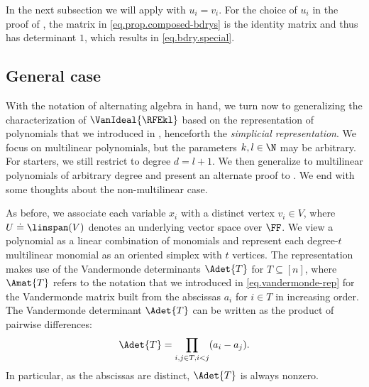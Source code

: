 \documentclass{toc}
\begin{document}
In the next subsection we will apply  with $u_i=v_i$. For the choice of $u_i$ in the proof of , the matrix in \eqref{eq.prop.composed-bdrys} is the identity matrix and thus has determinant $1$, which results in \eqref{eq.bdry.special}.


\subsection{General case}
\label{s.simplicial-repr.gen-case}

With the notation of alternating algebra in hand,
we turn now to generalizing the characterization of $\VanIdeal{\RFEkl}$ based on the representation of polynomials that we introduced in , henceforth the \emph{simplicial representation}. We focus on multilinear polynomials, but the parameters \(k,l\in\N\) may be arbitrary. For starters, we still restrict to degree $d=l+1$. We then generalize to multilinear polynomials of arbitrary degree and present an alternate proof to . We end with some thoughts about the non-multilinear case. 

As before, we associate each variable \(x_i\) with a distinct vertex \(v_i \in V\), where $U \doteq \linspan(V)$ denotes an underlying vector space over $\FF$. We view a polynomial as a linear combination of monomials and represent each
degree-$t$ multilinear monomial as an oriented simplex with $t$ vertices. The representation makes use of the Vandermonde determinants $\Adet{T}$ for $T \subseteq [n]$, where $\Amat{T}$ refers to the notation that we introduced in \eqref{eq.vandermonde-rep} for the Vandermonde matrix built from the abscissas $a_i$ for $i \in T$ in increasing order. The Vandermonde determinant $\Adet{T}$ can be written as the product of pairwise differences:
\begin{equation}\label{eq.vandermonde-rep.differences}
\Adet{T} = \prod_{i,j \in T, i<j} (a_i-a_j).
\end{equation}
In particular, as the abscissas are distinct, $\Adet{T}$ is always nonzero.
\end{document}
